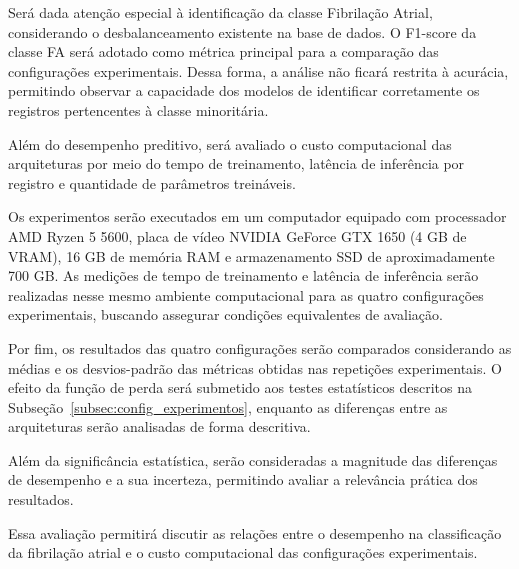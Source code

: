 \documentclass[
    12pt,                %
    openright,           %
    oneside,             %
    a4paper,             %
    english,             %
    brazil               %
]{abntex2}
\begin{document}
Será dada atenção especial à identificação da classe Fibrilação
Atrial, considerando o desbalanceamento existente na base de dados.
O F1-score da classe FA será adotado como métrica principal para
a comparação das configurações experimentais. Dessa forma, a análise
não ficará restrita à acurácia, permitindo observar a capacidade
dos modelos de identificar corretamente os registros pertencentes
à classe minoritária.

Além do desempenho preditivo, será avaliado o custo computacional
das arquiteturas por meio do tempo de treinamento, latência de
inferência por registro e quantidade de parâmetros treináveis.

Os experimentos serão executados em um computador equipado com
processador AMD Ryzen 5 5600, placa de vídeo NVIDIA GeForce GTX 1650 (4 GB de VRAM),
16 GB de memória RAM e armazenamento SSD de aproximadamente 700 GB.
As medições de tempo de treinamento e latência de inferência serão
realizadas nesse mesmo ambiente computacional para as quatro
configurações experimentais, buscando assegurar condições
equivalentes de avaliação.

Por fim, os resultados das quatro configurações serão
comparados considerando as médias e os desvios-padrão
das métricas obtidas nas repetições experimentais.
O efeito da função de perda será submetido aos
testes estatísticos descritos na
Subseção~\ref{subsec:config_experimentos}, enquanto
as diferenças entre as arquiteturas serão analisadas
de forma descritiva.

Além da significância estatística, serão consideradas
a magnitude das diferenças de desempenho e a sua
incerteza, permitindo avaliar a relevância prática
dos resultados.

Essa avaliação permitirá discutir as relações entre
o desempenho na classificação da fibrilação atrial
e o custo computacional das configurações
experimentais.

\end{document}
